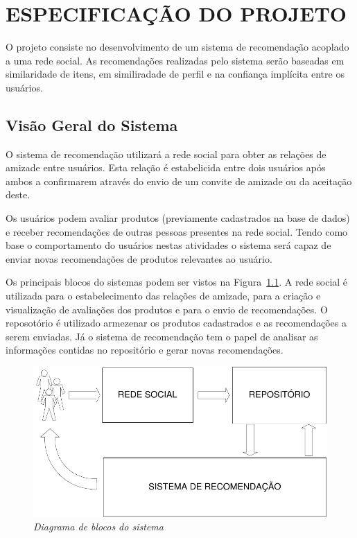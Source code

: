 \chapter{ESPECIFICAÇÃO DO PROJETO} %
\label{cha:especificacao_do_projeto}

 O projeto consiste no desenvolvimento de um sistema de recomendação acoplado a uma rede social. As recomendações realizadas pelo sistema serão baseadas em similaridade de itens, em similiradade de perfil e na confiança implícita entre os usuários.

\section{Visão Geral do Sistema} %
\label{sec:visao_do_sistema}

O sistema de recomendação utilizará a rede social para obter as relações de amizade entre usuários. Esta relação é estabelicida entre dois usuários após ambos a confirmarem através do envio de um convite de amizade ou da aceitação deste.

Os usuários podem avaliar produtos (previamente cadastrados na base de dados) e receber recomendações de outras pessoas presentes na rede social. Tendo como base o comportamento do usuários nestas atividades o sistema será capaz de enviar novas recomendações de produtos relevantes ao usuário.

 Os principais blocos do sistemas podem ser vistos na Figura~\ref{fig:escopo}. A rede social é utilizada para o estabelecimento das relações de amizade, para a criação e visualização de avaliações dos produtos e para o envio de recomendações. O reposotório é utilizado armezenar os produtos cadastrados e as recomendações a serem enviadas. Já o sistema de recomendação tem o papel de analisar as informações contidas no repositório e gerar novas recomendações.

\begin{figure}
  \centering
  \includegraphics[width=\textwidth]{imagens/Diagrama_Visao_Geral}
  \caption{\it Diagrama de blocos do sistema}
  \label{fig:escopo}
\end{figure}

